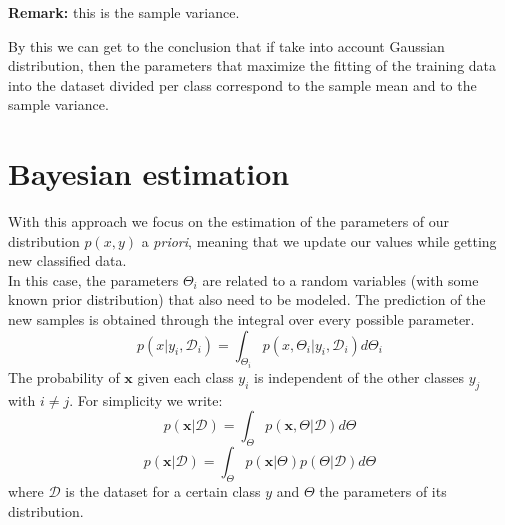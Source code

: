 \textbf{Remark:} this is the sample variance.
\newline

By this we can get to the conclusion that if take into account Gaussian distribution,
then the parameters that maximize the fitting of the training data into the
dataset divided per class correspond to the sample mean and to the sample
variance.


\section{Bayesian estimation}
\label{par:Bayesian_estimation} With this approach we focus on the estimation of
the parameters of our distribution $p(x, y)$ a \textit{priori}, meaning that we
update our values while getting new classified data.\\ In this case, the parameters
$\Theta_{i}$ are related to a random variables (with some known prior
distribution) that also need to be modeled. The prediction of the new samples is
obtained through the integral over every possible parameter.
\[
	p(x|y_{i}, \mathcal{D}_{i}) = \int_{\Theta_i}p(x, \Theta_{i}|y_{i}, \mathcal{D}
	_{i}) d\Theta_{i}
\]
The probability of $\pmb{x}$ given each class $y_{i}$ is independent of the other
classes $y_{j}$ with $i \neq j$. For simplicity we write:
\[
	p(\pmb{x}|\mathcal{D}) = \int_{\Theta}p(\pmb{x}, \Theta|\mathcal{D}) d\Theta
\]
\[
	p(\pmb{x}|\mathcal{D}) = \int_{\Theta}p(\pmb{x}|\Theta) p(\Theta | \mathcal{D})
	d\Theta
\]
where $\mathcal{D}$ is the dataset for a certain class $y$ and $\Theta$ the parameters
of its distribution.\\

